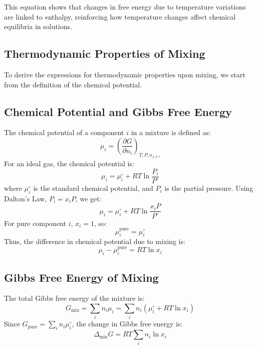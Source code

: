 \documentclass{article}
\theoremstyle{definition}
\begin{document}
This equation shows that changes in free energy due to temperature variations are linked to enthalpy, reinforcing how temperature changes affect chemical equilibria in solutions.
\subsection{Thermodynamic Properties of Mixing}

To derive the expressions for thermodynamic properties upon mixing, we start from the definition of the chemical potential.

\subsection{Chemical Potential and Gibbs Free Energy}
The chemical potential of a component $i$ in a mixture is defined as:
\begin{equation}
    \mu_i = \left( \frac{\partial G}{\partial n_i} \right)_{T, P, n_{j \neq i}}
\end{equation}
For an ideal gas, the chemical potential is:
\begin{equation}
    \mu_i = \mu_i^\circ + RT \ln \frac{P_i}{P^\circ}
\end{equation}
where $\mu_i^\circ$ is the standard chemical potential, and $P_i$ is the partial pressure. Using Dalton’s Law, $P_i = x_i P$, we get:
\begin{equation}
    \mu_i = \mu_i^\circ + RT \ln \frac{x_i P}{P^\circ}
\end{equation}
For pure component $i$, $x_i = 1$, so:
\begin{equation}
    \mu_i^{\text{pure}} = \mu_i^\circ
\end{equation}
Thus, the difference in chemical potential due to mixing is:
\begin{equation}
    \mu_i - \mu_i^{\text{pure}} = RT \ln x_i
\end{equation}

\subsection{Gibbs Free Energy of Mixing}
The total Gibbs free energy of the mixture is:
\begin{equation}
    G_{\text{mix}} = \sum_{i} n_i \mu_i = \sum_{i} n_i (\mu_i^\circ + RT \ln x_i)
\end{equation}
Since $G_{\text{pure}} = \sum_{i} n_i \mu_i^\circ$, the change in Gibbs free energy is:
\begin{equation}
    \Delta_{\text{mix}} G = RT \sum_{i} n_i \ln x_i
\end{equation}
\end{document}
